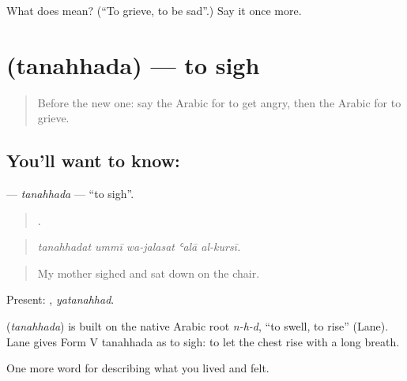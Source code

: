 \begin{tcolorbox}[breakable,colback=teal!4,colframe=teal!35!black,title={Before you move on}]
What does  mean? (\textquotedblleft{}To grieve, to be sad\textquotedblright{}.) Say it once more.
\end{tcolorbox}
\section[\texorpdfstring{\ar{تنهد} (tanahhada)}{تنهد (tanahhada)}]{ (tanahhada) — to sigh}

\label{lesson:AR-C488-tanahhada}



\begin{quote}
Before the new one: say the Arabic for to get angry, then the Arabic for to grieve.
\end{quote}

\subsection*{You'll want to know: }
\textbf{} — \emph{tanahhada} — \textquotedblleft{}to sigh\textquotedblright{}.

\begin{quote}
    .
\end{quote}

\begin{quote}
\emph{tanahhadat ummī wa-jalasat ʿalā al-kursī.}
\end{quote}

\begin{quote}
My mother sighed and sat down on the chair.
\end{quote}

Present: , \emph{yatanahhad}.

\begin{cousinweb}
\textbf{} (\emph{tanahhada}) is built on the native Arabic root \emph{n-h-d}, \textquotedblleft{}to swell, to rise\textquotedblright{} (Lane). Lane gives Form V tanahhada as to sigh: to let the chest rise with a long breath.
\end{cousinweb}

\begin{grammarlens}[title={What you've built}]
One more word for describing what you lived and felt.
\end{grammarlens}

